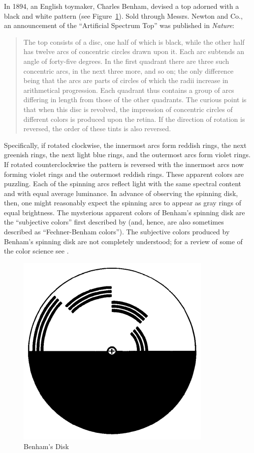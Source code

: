 \documentclass[12pt]{article}
\begin{document}
In 1894, an English toymaker, Charles Benham, devised a top adorned with a black and white pattern (see Figure~\ref{fig:benham}). Sold through Messrs. Newton and Co., an announcement of the ``Artificial Spectrum Top'' was published in \emph{Nature}:
\begin{quote}
	The top consists of a disc, one half of which is black, while the other half has twelve arcs of concentric circles drawn upon it. Each arc subtends an angle of forty-five degrees. In the first quadrant there are three such concentric arcs, in the next three more, and so on; the only difference being that the arcs are parts of circles of which the radii increase in arithmetical progression. Each quadrant thus contains a group of arcs differing in length from those of the other quadrants. The curious point is that when this disc is revolved, the impression of concentric circles of different colors is produced upon the retina. If the direction of rotation is reversed, the order of these tints is also reversed. \citep{Benham:1894kx}
\end{quote}
Specifically, if rotated clockwise, the innermost arcs form reddish rings, the next greenish rings, the next light blue rings, and the outermost arcs form violet rings. If rotated counterclockwise the pattern is reversed with the innermost arcs now forming violet rings and the outermost reddish rings. These apparent colors are puzzling. Each of the spinning arcs reflect light with the same spectral content and with equal average luminance. In advance of observing the spinning disk, then, one might reasonably expect the spinning arcs to appear as gray rings of equal brightness. The mysterious apparent colors of Benham's spinning disk are the ``subjective colors'' first described by \citep{Fechner:1838vn} (and, hence, are also sometimes described as ``Fechner-Benham colors''). The subjective colors produced by Benham's spinning disk are not completely understood; for a review of some of the color science see \citet{Campenhausen:1995yq}.

\begin{figure}[htbp]
	\centering
		\includegraphics[scale=.5]{graphics/benhams_disk.jpg}
	\caption{Benham's Disk}
	\label{fig:benham}
\end{figure}
\end{document}
